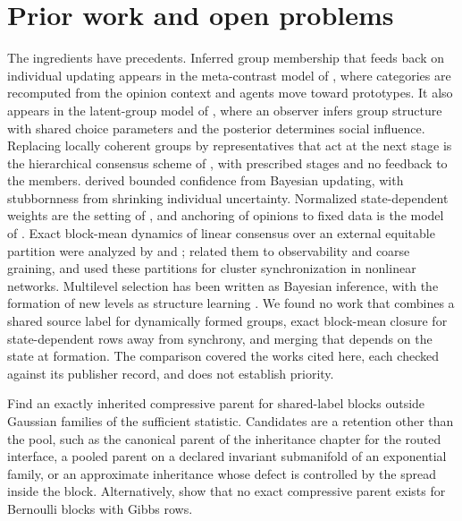 \documentclass[11pt,letterpaper]{report}
\begin{document}
\chapter{Prior work and open problems}
\label{it7:ch-prior}

The ingredients have precedents. Inferred group membership that feeds back on individual updating appears in the meta-contrast model of \citet{Salzarulo2006}, where categories are recomputed from the opinion context and agents move toward prototypes. It also appears in the latent-group model of \citet{GershmanPouncyGweon2017}, where an observer infers group structure with shared choice parameters and the posterior determines social influence. Replacing locally coherent groups by representatives that act at the next stage is the hierarchical consensus scheme of \citet{PeronyEtAl2012}, with prescribed stages and no feedback to the members. \citet{Martins2009} derived bounded confidence from Bayesian updating, with stubbornness from shrinking individual uncertainty. Normalized state-dependent weights are the setting of \citet{MotschTadmor2014}, and anchoring of opinions to fixed data is the model of \citet{FriedkinJohnsen1990}. Exact block-mean dynamics of linear consensus over an external equitable partition were analyzed by \citet{MartiniEgerstedtBicchi2010} and \citet{EgerstedtEtAl2012}; \citet{OClery2013} related them to observability and coarse graining, and \citet{SchaubEtAl2016} used these partitions for cluster synchronization in nonlinear networks. Multilevel selection has been written as Bayesian inference, with the formation of new levels as structure learning \citep{CzegelEtAl2019}. We found no work that combines a shared source label for dynamically formed groups, exact block-mean closure for state-dependent rows away from synchrony, and merging that depends on the state at formation. The comparison covered the works cited here, each checked against its publisher record, and does not establish priority.

Find an exactly inherited compressive parent for shared-label blocks outside Gaussian families of the sufficient statistic. Candidates are a retention other than the pool, such as the canonical parent of the inheritance chapter for the routed interface, a pooled parent on a declared invariant submanifold of an exponential family, or an approximate inheritance whose defect is controlled by the spread inside the block. Alternatively, show that no exact compressive parent exists for Bernoulli blocks with Gibbs rows.
\end{document}
